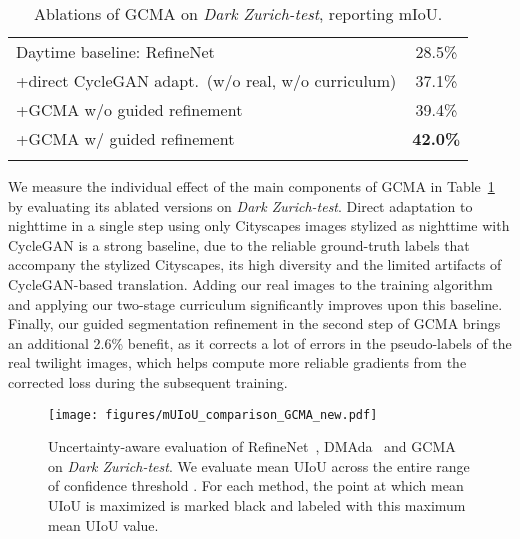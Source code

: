 \documentclass[10pt,twocolumn,letterpaper]{article}
\newcommand{\best}[1]{\textbf{#1}}
\newcommand{\PAR}[1]{\vskip4pt \noindent{\bf #1~}}
\begin{document}
\begin{table}[!tb]
  \caption{Ablations of GCMA on \emph{Dark Zurich-test}, reporting mIoU.}
  \label{table:exp:ablation:dark_zurich}
  \centering
  \setlength\tabcolsep{4pt}
  \footnotesize
  \begin{tabular}{lc}
  \toprule
  Daytime baseline: RefineNet~\cite{refinenet} & 28.5\%\\
  +direct CycleGAN adapt.\ (w/o real, w/o curriculum) & 37.1\%\\
  +GCMA w/o guided refinement & 39.4\%\\
  +GCMA w/ guided refinement & \best{42.0\%}\\
  \bottomrule
  \\
  \end{tabular}
\end{table}

\PAR{Ablation Study for GCMA.}
We measure the individual effect of the main components of GCMA in Table~\ref{table:exp:ablation:dark_zurich} by evaluating its ablated versions on \emph{Dark Zurich-test}. Direct adaptation to nighttime in a single step using only Cityscapes images stylized as nighttime with CycleGAN is a strong baseline, due to the reliable ground-truth labels that accompany the stylized Cityscapes, its high diversity and the limited artifacts of CycleGAN-based translation. Adding our real images to the training algorithm and applying our two-stage curriculum significantly improves upon this baseline. Finally, our guided segmentation refinement in the second step of GCMA brings an additional 2.6\% benefit, as it corrects a lot of errors in the pseudo-labels of the real twilight images, which helps compute more reliable gradients from the corrected loss during the subsequent training.

\begin{figure}[!tb]
    \centering
    \texttt{[image: figures/mUIoU\_comparison\_GCMA\_new.pdf]}
    \caption{Uncertainty-aware evaluation of RefineNet~\cite{refinenet}, DMAda~\cite{daytime:2:nighttime} and GCMA on \emph{Dark Zurich-test}. We evaluate mean UIoU across the entire range  of confidence threshold . For each method, the point at which mean UIoU is maximized is marked black and labeled with this maximum mean UIoU value.}
    \label{fig:exp:uiou}
\end{figure}
\end{document}
